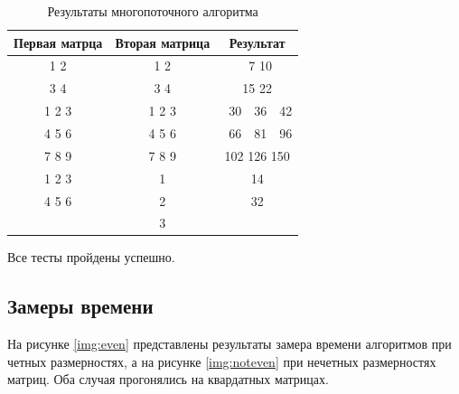 \documentclass[a4paper,12pt]{article}
\begin{document}
\begin{table}[H]
    \caption{Результаты многопоточного алгоритма}
    \label{table:test-res-th}
    \centering
    \begin{tabular}{|c|c|c|}
        \hline
        Первая матрца & Вторая матрица & Результат \\
        \hline
        1 2 & 1 2 & \ 7 10 \\
        3 4 & 3 4 & 15 22 \\
        \hline
        1 2 3 & 1 2 3 & \ 30\ \ 36\ \ 42 \\
        4 5 6 & 4 5 6 & \ 66\ \ 81\ \ 96 \\
        7 8 9 & 7 8 9 & 102 126 150 \\
        \hline
        1 2 3 & 1 & 14 \\
        4 5 6 & 2 & 32 \\
              & 3 & \\
        \hline
    \end{tabular}
\end{table}  

Все тесты пройдены успешно.

\subsection{Замеры времени}

На рисунке \ref{img:even} представлены результаты замера времени алгоритмов при
четных размерностях, а на рисунке \ref{img:noteven} при нечетных размерностях матриц.
Оба случая прогонялись на квардатных матрицах.
\end{document}
